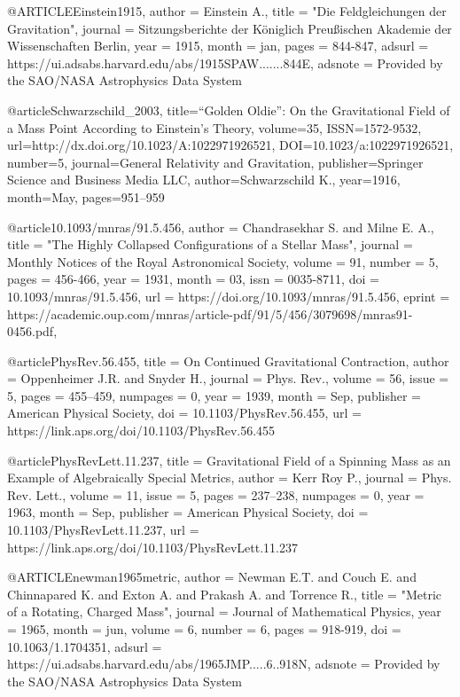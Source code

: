 
@ARTICLE{Einstein1915,
       author = {{Einstein A.}},
        title = "{Die Feldgleichungen der Gravitation}",
      journal = {Sitzungsberichte der K{\"o}niglich Preu{\ss}ischen Akademie der Wissenschaften Berlin},
         year = 1915,
        month = jan,
        pages = {844-847},
       adsurl = {https://ui.adsabs.harvard.edu/abs/1915SPAW.......844E},
      adsnote = {Provided by the SAO/NASA Astrophysics Data System}
}

@article{Schwarzschild_2003,
   title={“Golden Oldie”: On the Gravitational Field of a Mass Point According to Einstein’s Theory},
   volume={35},
   ISSN={1572-9532},
   url={http://dx.doi.org/10.1023/A:1022971926521},
   DOI={10.1023/a:1022971926521},
   number={5},
   journal={General Relativity and Gravitation},
   publisher={Springer Science and Business Media LLC},
   author={{Schwarzschild K.}},
   year={1916},
   month={May},
   pages={951–959}
}

@article{10.1093/mnras/91.5.456,
    author = {{Chandrasekhar S.} and {Milne E. A.}},
    title = "{The Highly Collapsed Configurations of a Stellar Mass}",
    journal = {Monthly Notices of the Royal Astronomical Society},
    volume = {91},
    number = {5},
    pages = {456-466},
    year = {1931},
    month = {03},
    issn = {0035-8711},
    doi = {10.1093/mnras/91.5.456},
    url = {https://doi.org/10.1093/mnras/91.5.456},
    eprint = {https://academic.oup.com/mnras/article-pdf/91/5/456/3079698/mnras91-0456.pdf},
}

@article{PhysRev.56.455,
  title = {On Continued Gravitational Contraction},
  author = {{Oppenheimer J.R.} and {Snyder H.}},
  journal = {Phys. Rev.},
  volume = {56},
  issue = {5},
  pages = {455--459},
  numpages = {0},
  year = {1939},
  month = {Sep},
  publisher = {American Physical Society},
  doi = {10.1103/PhysRev.56.455},
  url = {https://link.aps.org/doi/10.1103/PhysRev.56.455}
}

@article{PhysRevLett.11.237,
  title = {Gravitational Field of a Spinning Mass as an Example of Algebraically Special Metrics},
  author = {{Kerr Roy P.}},
  journal = {Phys. Rev. Lett.},
  volume = {11},
  issue = {5},
  pages = {237--238},
  numpages = {0},
  year = {1963},
  month = {Sep},
  publisher = {American Physical Society},
  doi = {10.1103/PhysRevLett.11.237},
  url = {https://link.aps.org/doi/10.1103/PhysRevLett.11.237}
}

@ARTICLE{newman1965metric,
       author = {{Newman E.T.} and {Couch E.} and {Chinnapared K.} and {Exton A.} and
         {Prakash A.} and {Torrence R.}},
        title = "{Metric of a Rotating, Charged Mass}",
      journal = {Journal of Mathematical Physics},
         year = 1965,
        month = jun,
       volume = {6},
       number = {6},
        pages = {918-919},
          doi = {10.1063/1.1704351},
       adsurl = {https://ui.adsabs.harvard.edu/abs/1965JMP.....6..918N},
      adsnote = {Provided by the SAO/NASA Astrophysics Data System}
}

